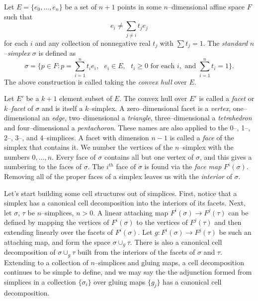 \begin{defn}
	Let $E=\{e_0,\dots,e_n\}$ be a set of $n+1$ points in some $n$--dimensional affine space $F$ such that
	\[
	  e_i\neq \sum_{j\neq i}t_j e_j
	\]
	for each $i$ and any collection of nonnegative real $t_j$ with $\sum t_j=1$.
	The \emph{standard} $n$--\emph{simplex} $\sigma$ is defined as
	\[
	  \sigma = \{p\in F : p = \sum_{i=1}^n t_i e_i,\text{ } e_i\in E,\text{ } t_i\geq 0\text{ for each }i, \text{ and }\sum_{i=1}^n t_i=1\}.
	\]
	The above construction is called taking the \emph{convex hull} over $E$.
	
	Let $E'$ be a $k+1$ element subset of $E$.
	The convex hull over $E'$ is called a \emph{facet} or \emph{$k$--facet} of $\sigma$ and is itself a $k$--simplex.
	A zero--dimensional facet is a \emph{vertex}, one--dimensional an \emph{edge}, two--dimensional a \emph{triangle}, three--dimensional a \emph{tetrahedron} and four--dimensional a \emph{pentachoron}.
	These names are also applied to the 0--, 1--, 2--, 3--, and 4--simplices.
	A facet with dimension $n-1$ is called a \emph{face} of the simplex that contains it.
	We number the vertices of the $n$--simplex with the numbers $0,\dots,n$.
	Every face of $\sigma$ contains all but one vertex of $\sigma$, and this gives a numbering to the faces of $\sigma$.
	The $i^{th}$ face of $\sigma$ is found via the \emph{face map} $F^i(\sigma)$.
	Removing all of the proper faces of a simplex leaves us with the \emph{interior} of $\sigma$.
\end{defn}

Let's start building some cell structures out of simplices.
First, notice that a simplex has a canonical cell decomposition into the interiors of its facets.
Next, let $\sigma$, $\tau$ be $n$--simplices, $n>0$.
A linear attaching map $F^i(\sigma)\to F^j(\tau)$ can be defined by mapping the vertices of $F^i(\sigma)$ to the vertices of $F^j(\tau)$ and then extending linearly over the facets of $F^i(\sigma)$.
Let $g:F^i(\sigma)\to F^j(\tau)$ be such an attaching map, and form the space $\sigma\cup_g \tau$.
There is also a canonical cell decomposition of $\sigma\cup_g \tau$ built from the interiors of the facets of $\sigma$ and $\tau$.
Extending to a collection of $n$--simplices and gluing maps, a cell decomposition continues to be simple to define, and we may say the the adjunction formed from simplices in a collection $\{\sigma_i\}$ over gluing maps $\{g_j\}$ has a canonical cell decomposition.

